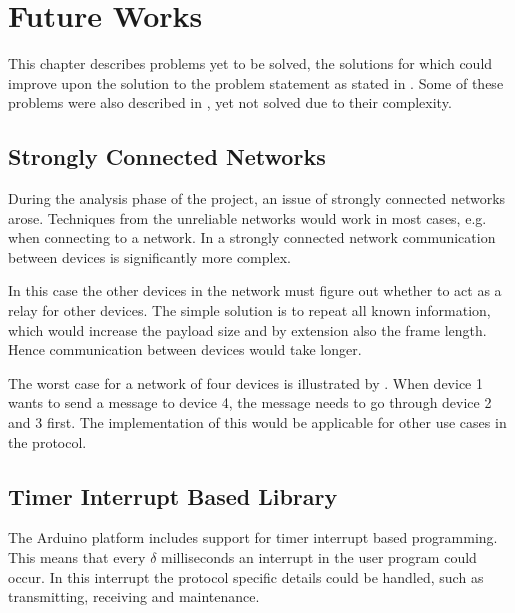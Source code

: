 \chapter{Future Works}
This chapter describes problems yet to be solved, the solutions for which could improve upon the solution to the problem statement as stated in . 
Some of these problems were also described in , yet not solved due to their complexity.

\section{Strongly Connected Networks}
During the analysis phase of the project, an issue of strongly connected networks arose.  
Techniques from the unreliable networks would work in most cases, e.g. when connecting to a network. 
In a strongly connected network communication between devices is significantly more complex.

\noindent
In this case the other devices in the network must figure out whether to act as a relay for other devices. 
The simple solution is to repeat all known information, which would increase the payload size and by extension also the frame length.
Hence communication between devices would take longer.

The worst case for a network of four devices is illustrated by .
When device 1 wants to send a message to device 4, the message needs to go through device 2 and 3 first.
The implementation of this would be applicable for other use cases in the protocol. 

\section{Timer Interrupt Based Library}
The Arduino platform includes support for timer interrupt based programming.
This means that every $\delta$ milliseconds an interrupt in the user program could occur.
In this interrupt the protocol specific details could be handled, such as transmitting, receiving and maintenance.

